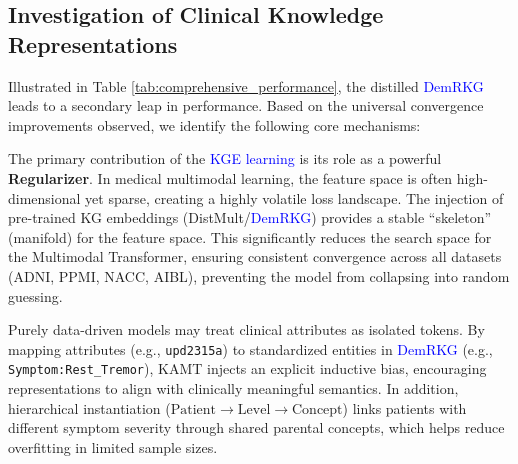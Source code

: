 \documentclass[lettersize,journal]{IEEEtran}
\begin{document}
\subsection{Investigation of Clinical Knowledge Representations}

    Illustrated in Table \ref{tab:comprehensive_performance}, the distilled \textcolor{blue}{DemRKG} leads to a secondary leap in performance. Based on the universal convergence improvements observed, we identify the following core mechanisms:

    
    The primary contribution of the \textcolor{blue}{KGE learning} is its role as a powerful \textbf{Regularizer}. In medical multimodal learning, the feature space is often high-dimensional yet sparse, creating a highly volatile loss landscape. The injection of pre-trained KG embeddings (DistMult/\textcolor{blue}{DemRKG}) provides a stable ``skeleton'' (manifold) for the feature space. This significantly reduces the search space for the Multimodal Transformer, ensuring consistent convergence across all datasets (ADNI, PPMI, NACC, AIBL), preventing the model from collapsing into random guessing.


    Purely data-driven models may treat clinical attributes as isolated tokens. By mapping attributes (e.g., \texttt{upd2315a}) to standardized entities in \textcolor{blue}{DemRKG} (e.g., \texttt{Symptom:Rest\_Tremor}), KAMT injects an explicit inductive bias, encouraging representations to align with clinically meaningful semantics. In addition, hierarchical instantiation ($\text{Patient} \to \text{Level} \to \text{Concept}$) links patients with different symptom severity through shared parental concepts, which helps reduce overfitting in limited sample sizes.
\end{document}
